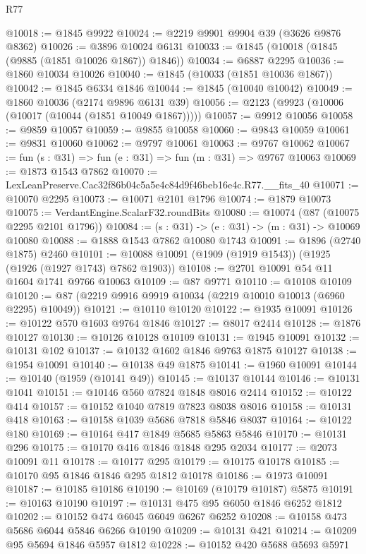 \begin{lexlean}{R77}
\begin{coremodule}
@10018 := @1845 @9922
@10024 := @2219 @9901 @9904 @39 (@3626 @9876 @8362)
@10026 := @3896 @10024 @6131
@10033 := @1845 (@10018 (@1845 (@9885 (@1851 @10026 @1867)) @1846))
@10034 := @6887 @2295
@10036 := @1860 @10034 @10026
@10040 := @1845 (@10033 (@1851 @10036 @1867))
@10042 := @1845 @6334 @1846
@10044 := @1845 (@10040 @10042)
@10049 := @1860 @10036 (@2174 @9896 @6131 @39)
@10056 := @2123 (@9923 (@10006 (@10017 (@10044 (@1851 @10049 @1867)))))
@10057 := @9912 @10056
@10058 := @9859 @10057
@10059 := @9855 @10058
@10060 := @9843 @10059
@10061 := @9831 @10060
@10062 := @9797 @10061
@10063 := @9767 @10062
@10067 := fun (s : @31) => fun (e : @31) => fun (m : @31) => @9767 @10063
@10069 := @1873 @1543 @7862
@10070 := LexLeanPreserve.Cac32f86b04c5a5e4c84d9f46beb16e4c.R77.__fits_40
@10071 := @10070 @2295
@10073 := @10071 @2101 @1796
@10074 := @1879 @10073
@10075 := VerdantEngine.ScalarF32.roundBits
@10080 := @10074 (@87 (@10075 @2295 @2101 @1796))
@10084 := (s : @31) -> (e : @31) -> (m : @31) -> @10069 @10080
@10088 := @1888 @1543 @7862 @10080 @1743
@10091 := @1896 (@2740 @1875) @2460
@10101 := @10088 @10091 (@1909 (@1919 @1543)) (@1925 (@1926 (@1927 @1743) @7862 @1903))
@10108 := @2701 @10091 @54 @11 @1604 @1741 @9766 @10063
@10109 := @87 @9771
@10110 := @10108 @10109
@10120 := @87 (@2219 @9916 @9919 @10034 (@2219 @10010 @10013 (@6960 @2295) @10049))
@10121 := @10110 @10120
@10122 := @1935 @10091
@10126 := @10122 @570 @1603 @9764 @1846
@10127 := @8017 @2414
@10128 := @1876 @10127
@10130 := @10126 @10128 @10109
@10131 := @1945 @10091
@10132 := @10131 @102
@10137 := @10132 @1602 @1846 @9763 @1875 @10127
@10138 := @1954 @10091
@10140 := @10138 @49 @1875
@10141 := @1960 @10091
@10144 := @10140 (@1959 (@10141 @49))
@10145 := @10137 @10144
@10146 := @10131 @1041
@10151 := @10146 @560 @7824 @1848 @8016 @2414
@10152 := @10122 @414
@10157 := @10152 @1040 @7819 @7823 @8038 @8016
@10158 := @10131 @418
@10163 := @10158 @1039 @5686 @7818 @5846 @8037
@10164 := @10122 @180
@10169 := @10164 @417 @1849 @5685 @5863 @5846
@10170 := @10131 @296
@10175 := @10170 @416 @1846 @1848 @295 @2034
@10177 := @2073 @10091 @11
@10178 := @10177 @295
@10179 := @10175 @10178
@10185 := @10170 @95 @1846 @1846 @295 @1812 @10178
@10186 := @1973 @10091
@10187 := @10185 @10186
@10190 := @10169 (@10179 @10187) @5875
@10191 := @10163 @10190
@10197 := @10131 @475 @95 @6050 @1846 @6252 @1812
@10202 := @10152 @474 @6045 @6049 @6267 @6252
@10208 := @10158 @473 @5686 @6044 @5846 @6266 @10190
@10209 := @10131 @421
@10214 := @10209 @95 @5694 @1846 @5957 @1812
@10228 := @10152
    @420
    @5688
    @5693
    @5971

\end{coremodule}
\end{lexlean}
